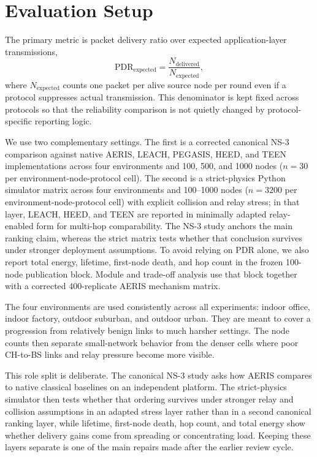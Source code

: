 \documentclass[letterpaper,conference]{IEEEtran}
\begin{document}
\section{Evaluation Setup}
The primary metric is packet delivery ratio over expected application-layer transmissions,
\begin{equation}
\mathrm{PDR}_{\mathrm{expected}}=\frac{N_{\mathrm{delivered}}}{N_{\mathrm{expected}}},
\end{equation}
where $N_{\mathrm{expected}}$ counts one packet per alive source node per round even if a protocol suppresses actual transmission. This denominator is kept fixed across protocols so that the reliability comparison is not quietly changed by protocol-specific reporting logic.

We use two complementary settings. The first is a corrected canonical NS-3 comparison against native AERIS, LEACH, PEGASIS, HEED, and TEEN implementations across four environments and 100, 500, and 1000 nodes ($n=30$ per environment-node-protocol cell). The second is a strict-physics Python simulator matrix across four environments and 100--1000 nodes ($n=3200$ per environment-node-protocol cell) with explicit collision and relay stress; in that layer, LEACH, HEED, and TEEN are reported in minimally adapted relay-enabled form for multi-hop comparability. The NS-3 study anchors the main ranking claim, whereas the strict matrix tests whether that conclusion survives under stronger deployment assumptions. To avoid relying on PDR alone, we also report total energy, lifetime, first-node death, and hop count in the frozen 100-node publication block. Module and trade-off analysis use that block together with a corrected 400-replicate AERIS mechanism matrix.

The four environments are used consistently across all experiments: indoor office, indoor factory, outdoor suburban, and outdoor urban. They are meant to cover a progression from relatively benign links to much harsher settings. The node counts then separate small-network behavior from the denser cells where poor CH-to-BS links and relay pressure become more visible.

This role split is deliberate. The canonical NS-3 study asks how AERIS compares to native classical baselines on an independent platform. The strict-physics simulator then tests whether that ordering survives under stronger relay and collision assumptions in an adapted stress layer rather than in a second canonical ranking layer, while lifetime, first-node death, hop count, and total energy show whether delivery gains come from spreading or concentrating load. Keeping these layers separate is one of the main repairs made after the earlier review cycle.
\end{document}
